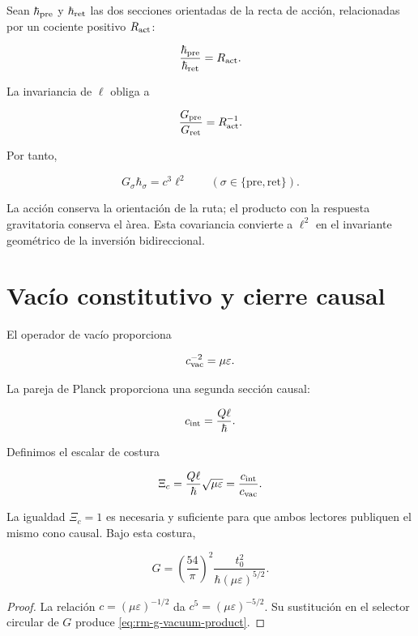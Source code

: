Sean \(\hbar_{\rm pre}\) y \(\hbar_{\rm ret}\) las dos secciones orientadas
de la recta de acci\'on, relacionadas por un cociente positivo
\(R_{\rm act}\):

\[
\frac{\hbar_{\rm pre}}{\hbar_{\rm ret}}=R_{\rm act}.
\]

La invariancia de \(\ell\) obliga a

\[
\frac{G_{\rm pre}}{G_{\rm ret}}=R_{\rm act}^{-1}.
\]

Por tanto,

\begin{equation}
G_{\sigma}\hbar_{\sigma}=c^3\ell^2
\qquad(\sigma\in\{\mathrm{pre},\mathrm{ret}\}).
\label{eq:rm-two-way-area}
\end{equation}

La acci\'on conserva la orientaci\'on de la ruta; el producto con la respuesta
gravitatoria conserva el \`area. Esta covariancia convierte a \(\ell^2\) en
el invariante geom\'etrico de la inversi\'on bidireccional.

\section{Vac\'io constitutivo y cierre causal}

El operador de vac\'io proporciona

\[
c_{\rm vac}^{-2}=\mu\varepsilon.
\]

La pareja de Planck proporciona una segunda secci\'on causal:

\[
c_{\rm int}=\frac{Q\ell}{\hbar}.
\]

Definimos el escalar de costura

\begin{equation}
\Xi_c=\frac{Q\ell}{\hbar}\sqrt{\mu\varepsilon}
=\frac{c_{\rm int}}{c_{\rm vac}}.
\label{eq:rm-causal-seam}
\end{equation}

La igualdad \(\Xi_c=1\) es necesaria y suficiente para que ambos lectores
publiquen el mismo cono causal. Bajo esta costura,

\begin{equation}
\boxed{
G=\left(\frac{54}{\pi}\right)^2
\frac{t_0^2}{\hbar(\mu\varepsilon)^{5/2}}.}
\label{eq:rm-g-vacuum-product}
\end{equation}

\begin{proof}
La relaci\'on \(c=(\mu\varepsilon)^{-1/2}\) da
\(c^5=(\mu\varepsilon)^{-5/2}\). Su sustituci\'on en el selector circular de
\(G\) produce \eqref{eq:rm-g-vacuum-product}.
\end{proof}


